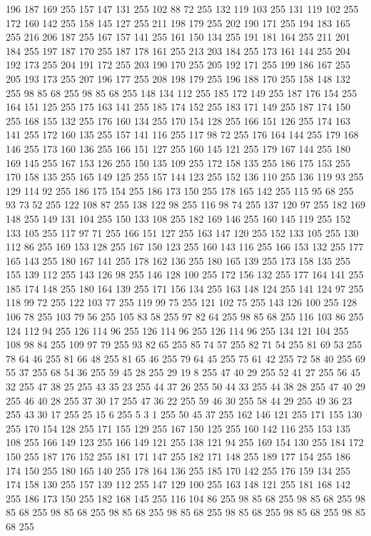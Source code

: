 196 187 169 255 157 147 131 255 102 88 72 255 132 119 103 255 131 119 102 255 172 160 142 255 158 145 127 255 211 198 179 255 202 190 171 255 194 183 165 255 216 206 187 255 167 157 141 255 161 150 134 255 191 181 164 255 211 201 184 255 197 187 170 255 187 178 161 255 213 203 184 255 173 161 144 255 204 192 173 255 204 191 172 255 203 190 170 255 205 192 171 255 199 186 167 255 205 193 173 255 207 196 177 255 208 198 179 255 196 188 170 255 158 148 132 255 98 85 68 255 98 85 68 255 148 134 112 255 185 172 149 255 187 176 154 255 164 151 125 255 175 163 141 255 185 174 152 255 183 171 149 255 187 174 150 255 168 155 132 255 176 160 134 255 170 154 128 255 166 151 126 255 174 163 141 255 172 160 135 255 157 141 116 255 117 98 72 255 176 164 144 255 179 168 146 255 173 160 136 255 166 151 127 255 160 145 121 255 179 167 144 255 180 169 145 255 167 153 126 255 150 135 109 255 172 158 135 255 186 175 153 255 170 158 135 255 165 149 125 255 157 144 123 255 152 136 110 255 136 119 93 255 129 114 92 255
186 175 154 255 186 173 150 255 178 165 142 255 115 95 68 255 93 73 52 255 122 108 87 255 138 122 98 255 116 98 74 255 137 120 97 255 182 169 148 255 149 131 104 255 150 133 108 255 182 169 146 255 160 145 119 255 152 133 105 255 117 97 71 255 166 151 127 255 163 147 120 255 152 133 105 255 130 112 86 255 169 153 128 255 167 150 123 255 160 143 116 255 166 153 132 255 177 165 143 255 180 167 141 255 178 162 136 255 180 165 139 255 173 158 135 255 155 139 112 255 143 126 98 255 146 128 100 255 172 156 132 255 177 164 141 255 185 174 148 255 180 164 139 255 171 156 134 255 163 148 124 255 141 124 97 255 118 99 72 255 122 103 77 255 119 99 75 255 121 102 75 255 143 126 100 255 128 106 78 255 103 79 56 255 105 83 58 255 97 82 64 255 98 85 68 255 116 103 86 255 124 112 94 255 126 114 96 255 126 114 96 255 126 114 96 255 134 121 104 255 108 98 84 255 109 97 79 255 93 82 65 255 85 74 57 255 82 71 54 255 81 69 53 255 78 64 46 255 81 66 48 255 81 65 46 255
79 64 45 255 75 61 42 255 72 58 40 255 69 55 37 255 68 54 36 255 59 45 28 255 29 19 8 255 47 40 29 255 52 41 27 255 56 45 32 255 47 38 25 255 43 35 23 255 44 37 26 255 50 44 33 255 44 38 28 255 47 40 29 255 46 40 28 255 37 30 17 255 47 36 22 255 59 46 30 255 58 44 29 255 49 36 23 255 43 30 17 255 25 15 6 255 5 3 1 255 50 45 37 255 162 146 121 255 171 155 130 255 170 154 128 255 171 155 129 255 167 150 125 255 160 142 116 255 153 135 108 255 166 149 123 255 166 149 121 255 138 121 94 255 169 154 130 255 184 172 150 255 187 176 152 255 181 171 147 255 182 171 148 255 189 177 154 255 186 174 150 255 180 165 140 255 178 164 136 255 185 170 142 255 176 159 134 255 174 158 130 255 157 139 112 255 147 129 100 255 163 148 121 255 181 168 142 255 186 173 150 255 182 168 145 255 116 104 86 255 98 85 68 255 98 85 68 255 98 85 68 255 98 85 68 255 98 85 68 255 98 85 68 255 98 85 68 255 98 85 68 255 98 85 68 255
